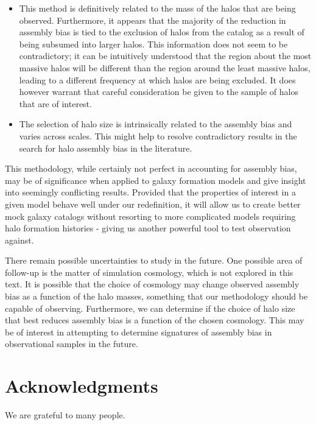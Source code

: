 \documentclass[usenatbib]{mnras}
\begin{document}
\begin{itemize}
	\item This method is definitively related to the mass of the halos that are being observed. Furthermore, it
appears that the majority of the reduction in assembly bias is tied to the exclusion of halos from the catalog as
a result of being subsumed into larger halos. This information does not seem to be contradictory; it can be
intuitively understood that the region about the most massive halos will be different than the region around the
least massive halos, leading to a different frequency at which halos are being excluded. It does however warrant
that careful consideration be given to the sample of halos that are of interest.

	\item The selection of halo size is intrinsically related to the assembly bias and varies across scales. This
might help to resolve contradictory results in the search for halo assembly bias in the literature.
\end{itemize}

This methodology, while certainly not perfect in accounting for assembly bias, may be of significance when
applied to galaxy formation models and give insight into seemingly conflicting results. Provided that the
properties of interest in a given model behave well under our redefinition, it will allow us to create better
mock galaxy catalogs without resorting to more complicated models requiring halo formation histories - giving us
another powerful tool to test observation against.

There remain possible uncertainties to study in the future. One possible area of follow-up is the matter of
simulation cosmology, which is not explored in this text. It is possible that the choice of cosmology may change
observed assembly bias as a function of the halo masses, something that our methodology should be capable of
observing. Furthermore, we can determine if the choice of halo size that best reduces assembly bias is a function
of the chosen cosmology. This may be of interest in attempting to determine signatures of assembly bias in
observational samples in the future.

\section*{Acknowledgments}

We are grateful to many people.


\end{document}
